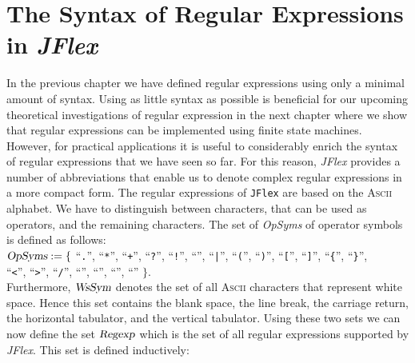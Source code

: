 \section{The Syntax of Regular Expressions in \textsl{JFlex}}
In the previous chapter we have defined regular expressions using only a minimal amount of syntax. 
Using as little syntax as possible is beneficial for our upcoming theoretical investigations of
regular expression in the next chapter where we show that regular expressions can be implemented
using finite state machines.  However, for practical applications it is useful to considerably
enrich the syntax of regular expressions that we have seen so far.
For this reason, \textsl{JFlex}\/ provides a number of abbreviations that enable us to denote
complex regular expressions in a more compact form.  The regular expressions of \texttt{JFlex} are
based on the \textsc{Ascii} alphabet.  We have to distinguish between characters, that can be used
as operators, and the remaining characters.   The set of \textsl{OpSyms} of operator symbols is
defined as follows:
\\[0.2cm]
\hspace*{1.3cm}
$\textsl{OpSyms} := \{$ ``\texttt{.}'', 
``\texttt{*}'', 
``\texttt{+}'', 
``\texttt{?}'', 
``\texttt{!}'', 
``\texttt{}'', 
``\texttt{|}'', 
``\texttt{(}'', 
``\texttt{)}'', 
``\texttt{[}'', 
``\texttt{]}'', 
``\texttt{\{}'', 
``\texttt{\}}'', 
\\[0.2cm]
\hspace*{3.4cm}
``\texttt{<}'', 
``\texttt{>}'',
``\texttt{/}'', 
``\texttt{}'', 
``\texttt{}'', 
``\texttt{}'', 
``\texttt{}'' $\}$.
\\[0.2cm]
Furthermore,  $\textsl{WsSym}$ denotes the set of all \textsc{Ascii} characters that represent white
space.  Hence this set contains the blank space, the line break, the carriage return, the horizontal
tabulator, and the vertical tabulator.
Using these two sets we can now define the set $\textsl{Regexp}\/$ which is the set of all regular
expressions supported by \textsl{JFlex}.  This set is defined inductively:
